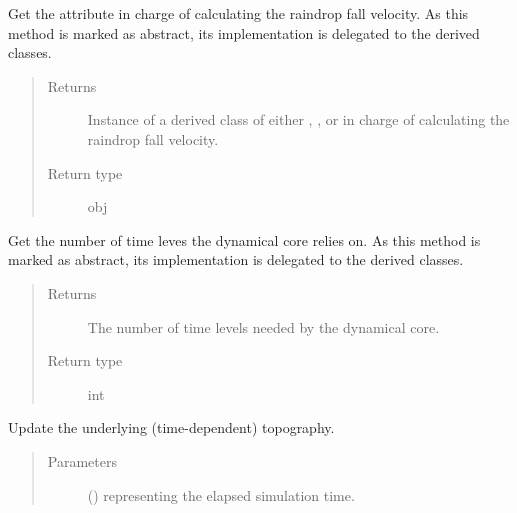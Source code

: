 \documentclass[letterpaper,10pt,english]{sphinxmanual}
\begin{document}
\begin{fulllineitems}
\begin{fulllineitems}
\end{fulllineitems}


\begin{fulllineitems}
\label{\detokenize{api:dycore.dycore.DynamicalCore.microphysics}}
Get the attribute in charge of calculating the raindrop fall velocity.
As this method is marked as abstract, its implementation is delegated to the derived classes.
\begin{quote}\begin{description}
\item[{Returns}] \leavevmode
Instance of a derived class of either
,
,
or  in
charge of calculating the raindrop fall velocity.

\item[{Return type}] \leavevmode
obj

\end{description}\end{quote}

\end{fulllineitems}


\begin{fulllineitems}
\label{\detokenize{api:dycore.dycore.DynamicalCore.time_levels}}
Get the number of time leves the dynamical core relies on.
As this method is marked as abstract, its implementation is delegated to the derived classes.
\begin{quote}\begin{description}
\item[{Returns}] \leavevmode
The number of time levels needed by the dynamical core.

\item[{Return type}] \leavevmode
int

\end{description}\end{quote}

\end{fulllineitems}


\begin{fulllineitems}
\label{\detokenize{api:dycore.dycore.DynamicalCore.update_topography}}
Update the underlying (time-dependent) topography.
\begin{quote}\begin{description}
\item[{Parameters}] \leavevmode
{} () \textendash{}  representing the elapsed simulation time.


\end{description}
\end{quote}
\end{fulllineitems}
\end{fulllineitems}
\end{document}
